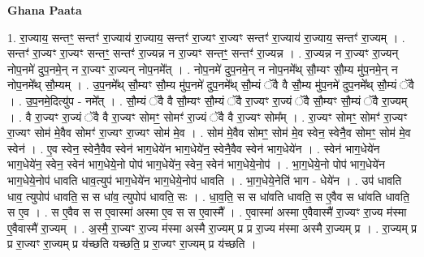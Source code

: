 \documentclass[17pt]{extarticle}
\begin{document}
\textbf{Ghana Paata } \newline

1. रा॒ज्याय॒ सन्तꣳ॒॒ सन्तꣳ॑ रा॒ज्याय॑ रा॒ज्याय॒ सन्तꣳ॑ रा॒ज्यꣳ रा॒ज्यꣳ सन्तꣳ॑ रा॒ज्याय॑ रा॒ज्याय॒ सन्तꣳ॑ रा॒ज्यम् । . सन्तꣳ॑ रा॒ज्यꣳ रा॒ज्यꣳ सन्तꣳ॒॒ सन्तꣳ॑ रा॒ज्यन्न न रा॒ज्यꣳ सन्तꣳ॒॒ सन्तꣳ॑ रा॒ज्यन्न । . रा॒ज्यन्न न रा॒ज्यꣳ रा॒ज्यन् नोप॒नमे॑ दुप॒नमे॒न् न रा॒ज्यꣳ रा॒ज्यन् नोप॒नमे᳚त् । . नोप॒नमे॑ दुप॒नमे॒न् न नोप॒नमे᳚थ् सौ॒म्यꣳ सौ॒म्य मु॑प॒नमे॒न् न नोप॒नमे᳚थ् सौ॒म्यम् । . उ॒प॒नमे᳚थ् सौ॒म्यꣳ सौ॒म्य मु॑प॒नमे॑ दुप॒नमे᳚थ् सौ॒म्यं ॅवै वै सौ॒म्य मु॑प॒नमे॑ दुप॒नमे᳚थ् सौ॒म्यं ॅवै । . उ॒प॒नमे॒दित्यु॑प - नमे᳚त् । . सौ॒म्यं ॅवै वै सौ॒म्यꣳ सौ॒म्यं ॅवै रा॒ज्यꣳ रा॒ज्यं ॅवै सौ॒म्यꣳ सौ॒म्यं ॅवै रा॒ज्यम् । . वै रा॒ज्यꣳ रा॒ज्यं ॅवै वै रा॒ज्यꣳ सोमꣳ॒॒ सोमꣳ॑ रा॒ज्यं ॅवै वै रा॒ज्यꣳ सोम᳚म् । . रा॒ज्यꣳ सोमꣳ॒॒ सोमꣳ॑ रा॒ज्यꣳ रा॒ज्यꣳ सोम॑ मे॒वैव सोमꣳ॑ रा॒ज्यꣳ रा॒ज्यꣳ सोम॑ मे॒व । . सोम॑ मे॒वैव सोमꣳ॒॒ सोम॑ मे॒व स्वेन॒ स्वेनै॒व सोमꣳ॒॒ सोम॑ मे॒व स्वेन॑ । . ए॒व स्वेन॒ स्वेनै॒वैव स्वेन॑ भाग॒धेये॑न भाग॒धेये॑न॒ स्वेनै॒वैव स्वेन॑ भाग॒धेये॑न । . स्वेन॑ भाग॒धेये॑न भाग॒धेये॑न॒ स्वेन॒ स्वेन॑ भाग॒धेये॒नो पोप॑ भाग॒धेये॑न॒ स्वेन॒ स्वेन॑ भाग॒धेये॒नोप॑ । . भा॒ग॒धेये॒नो पोप॑ भाग॒धेये॑न भाग॒धेये॒नोप॑ धावति धाव॒त्युप॑ भाग॒धेये॑न भाग॒धेये॒नोप॑ धावति । . भा॒ग॒धेये॒नेति॑ भाग - धेये॑न । . उप॑ धावति धाव॒ त्युपोप॑ धावति॒ स स धा॑व॒ त्युपोप॑ धावति॒ सः । . धा॒व॒ति॒ स स धा॑वति धावति॒ स ए॒वैव स धा॑वति धावति॒ स ए॒व । . स ए॒वैव स स ए॒वास्मा॑ अस्मा ए॒व स स ए॒वास्मै᳚ । . ए॒वास्मा॑ अस्मा ए॒वैवास्मै॑ रा॒ज्यꣳ रा॒ज्य म॑स्मा ए॒वैवास्मै॑ रा॒ज्यम् । . अ॒स्मै॒ रा॒ज्यꣳ रा॒ज्य म॑स्मा अस्मै रा॒ज्यम् प्र प्र रा॒ज्य म॑स्मा अस्मै रा॒ज्यम् प्र । . रा॒ज्यम् प्र प्र रा॒ज्यꣳ रा॒ज्यम् प्र य॑च्छति यच्छति॒ प्र रा॒ज्यꣳ रा॒ज्यम् प्र य॑च्छति । \newline
\end{document}
